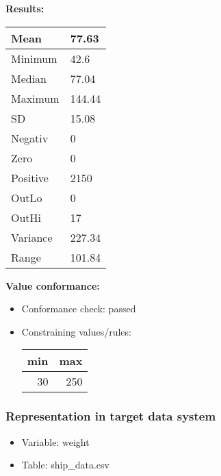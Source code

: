 \documentclass[
]{article}
\providecommand{\tightlist}{%
  \setlength{\itemsep}{0pt}\setlength{\parskip}{0pt}}
\begin{document}
\textbf{Results:}\\

\begin{table}[H]
\centering
\begin{tabular}{l|l}
\hline
Mean & 77.63\\
\hline
Minimum & 42.6\\
\hline
Median & 77.04\\
\hline
Maximum & 144.44\\
\hline
SD & 15.08\\
\hline
Negativ & 0\\
\hline
Zero & 0\\
\hline
Positive & 2150\\
\hline
OutLo & 0\\
\hline
OutHi & 17\\
\hline
Variance & 227.34\\
\hline
Range & 101.84\\
\hline
\end{tabular}
\end{table}

\textbf{Value conformance:}

\begin{itemize}
\tightlist
\item
  Conformance check: passed
\item
  Constraining values/rules:

  \begin{table}[H]
  \centering
  \begin{tabular}{r|r}
  \hline
  \textbf{min} & \textbf{max}\\
  \hline
  30 & 250\\
  \hline
  \end{tabular}
  \end{table}
\end{itemize}

\newpage

\hypertarget{representation-in-target-data-system-28}{%
\subsubsection{\texorpdfstring{Representation in \textbf{target} data
system}{Representation in target data system}}\label{representation-in-target-data-system-28}}

\begin{itemize}
\tightlist
\item
  Variable: weight
\item
  Table: ship\_data.csv
\end{itemize}
\end{document}

